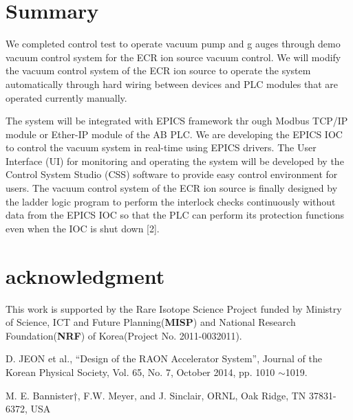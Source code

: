 \documentclass[a4paper,
              ]{jacow}
\newcommand\SEC[1]{\textbf{\uppercase{#1}}}
\begin{document}
\section{Summary}
We completed control test to operate vacuum pump and g auges through demo vacuum control system for the ECR ion source vacuum control. We will modify the vacuum control system of the ECR ion source to operate the system automatically through hard wiring between devices and PLC modules that are operated currently manually. %
%
\iftrue   %
\newpage
\raggedend
\fi
The system will be integrated with EPICS framework thr ough Modbus TCP/IP module or Ether-IP module of the AB PLC. We are developing the EPICS IOC to control the vacuum system in real-time using EPICS drivers. 
The User Interface (UI) for monitoring and operating the system will be developed by the Control System Studio (CSS) software to provide easy control environment for users.
The vacuum control system of the ECR ion source is finally designed by the ladder logic program to perform the interlock checks continuously without data from the EPICS IOC so that the PLC can perform its protection functions even when the IOC is  shut down [2].

\section{acknowledgment}
This work is supported by the Rare Isotope Science Project funded by Ministry of Science, ICT and Future Planning(\SEC{MISP}) and National Research Foundation(\SEC{NRF}) of Korea(Project No. 2011-0032011).

%
%
\iftrue   %
\raggedend
\fi

\begin{thebibliography}{99} %
 

	
	D. JEON et al., “Design of the RAON Accelerator System”, Journal of the Korean Physical Society, Vol. 65, No. 7, October 2014,  pp. 1010 $\sim$1019.

    M. E. Bannister†, F.W. Meyer, and J. Sinclair, ORNL, Oak Ridge, TN 37831-6372, USA



\end{thebibliography}
\end{document}
